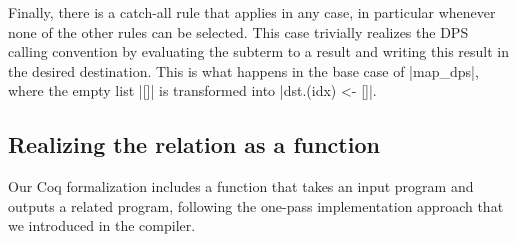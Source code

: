 Finally, there is a catch-all rule  that applies in any case, in particular whenever none of the other rules can be selected. This case trivially realizes the DPS calling convention by evaluating the subterm to a result and writing this result in the desired destination. This is what happens in the base case of \ocaml|map_dps|, where the empty list \ocaml|[]| is transformed into \ocaml|dst.(idx) <- []|.

% 


\subsection{Realizing the relation as a function}

Our Coq formalization includes a function that takes an input program and outputs a related program, following the one-pass implementation approach that we introduced in the \OCaml compiler.


